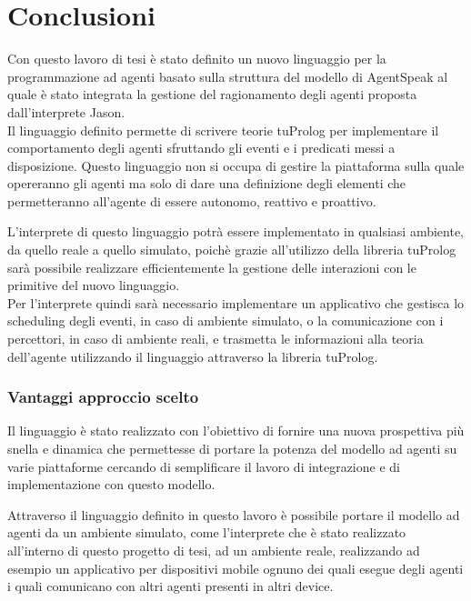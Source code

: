 \chapter*{Conclusioni}
Con questo lavoro di tesi è stato definito un nuovo linguaggio per la programmazione ad agenti basato sulla struttura del modello di AgentSpeak al quale è stato integrata la gestione del ragionamento degli agenti proposta dall'interprete Jason.
\\
Il linguaggio definito permette di scrivere teorie tuProlog per implementare il comportamento degli agenti sfruttando gli eventi e i predicati messi a disposizione.
Questo linguaggio non si occupa di gestire la piattaforma sulla quale opereranno gli agenti ma solo di dare una definizione degli elementi che permetteranno all'agente di essere autonomo, reattivo e proattivo.

L'interprete di questo linguaggio potrà essere implementato in qualsiasi ambiente, da quello reale a quello simulato, poichè grazie all'utilizzo della libreria tuProlog sarà possibile realizzare efficientemente la gestione delle interazioni con le primitive del nuovo linguaggio.
\\
Per l'interprete quindi sarà necessario implementare un applicativo che gestisca lo scheduling degli eventi, in caso di ambiente simulato, o la comunicazione con i percettori, in caso di ambiente reali, e trasmetta le informazioni alla teoria dell'agente utilizzando il linguaggio attraverso la libreria tuProlog.

\subsection*{Vantaggi approccio scelto}
Il linguaggio è stato realizzato con l'obiettivo di fornire una nuova prospettiva più snella e dinamica che permettesse di portare la potenza del modello ad agenti su varie piattaforme cercando di semplificare il lavoro di integrazione e di implementazione con questo modello.

Attraverso il linguaggio definito in questo lavoro è possibile portare il modello ad agenti da un ambiente simulato, come l'interprete che è stato realizzato all'interno di questo progetto di tesi, ad un ambiente reale, realizzando ad esempio un applicativo per dispositivi mobile ognuno dei quali esegue degli agenti i quali comunicano con altri agenti presenti in altri device.